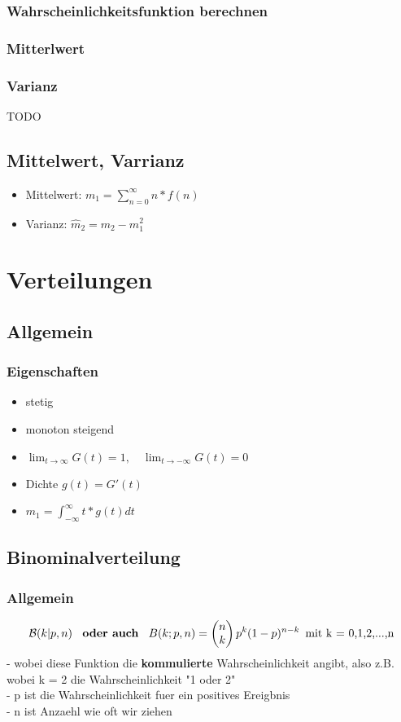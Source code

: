\documentclass{article}
\begin{document}
	\subsubsection{Wahrscheinlichkeitsfunktion berechnen}
	\subsubsection{Mitterlwert}
	\subsubsection{Varianz}
	TODO
	\subsection{Mittelwert, Varrianz}
	\begin{itemize}
		\item Mittelwert: $m_1 = \sum_{n=0}^\infty n*f(n)$
		\item Varianz: $\widehat{m}_2 = m_2 - m_1^2$
	\end{itemize}
	\section{Verteilungen}
	\subsection{Allgemein}
	\subsubsection{Eigenschaften}
	\begin{itemize}		
		\item stetig
		\item monoton steigend
		\item $\lim_{t \to \infty} G(t) = 1, \quad \lim_{t \to -\infty} G(t) = 0$
		\item Dichte $g(t) = G'(t)$
		\item $m_1 = \int_{-\infty}^{\infty}t*g(t)dt$
	\end{itemize}
	\subsection{Binominalverteilung}
	\subsubsection{Allgemein}
	\[
		\mathcal{B}(k | p,n) \enspace \textbf{ oder auch } \enspace B(k;p,n) = 
		\begin{pmatrix} n \\ k \end{pmatrix} p^k(1-p)^{n-k} \enspace \newline
		\text{mit k = 0,1,2,...,n} \]
		- wobei diese Funktion die \textbf{kommulierte} Wahrscheinlichkeit angibt, also z.B.
		wobei k = 2 die Wahrscheinlichkeit "1 oder 2"
		\\ - p ist die Wahrscheinlichkeit fuer ein positives Ereigbnis
		\\ - n ist Anzaehl wie oft wir ziehen
	
\end{document}

